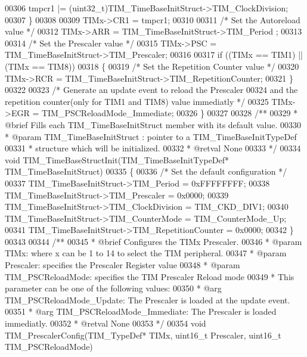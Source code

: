 \begin{DoxyCode}
00306     tmpcr1 |= (uint32\_t)TIM\_TimeBaseInitStruct->TIM_ClockDivision;
00307   \}
00308 
00309   TIMx->CR1 = tmpcr1;
00310 
00311   \textcolor{comment}{/* Set the Autoreload value */}
00312   TIMx->ARR = TIM\_TimeBaseInitStruct->TIM\_Period ;
00313 
00314   \textcolor{comment}{/* Set the Prescaler value */}
00315   TIMx->PSC = TIM\_TimeBaseInitStruct->TIM\_Prescaler;
00316 
00317   \textcolor{keywordflow}{if} ((TIMx == TIM1) || (TIMx == TIM8))
00318   \{
00319     \textcolor{comment}{/* Set the Repetition Counter value */}
00320     TIMx->RCR = TIM\_TimeBaseInitStruct->TIM\_RepetitionCounter;
00321   \}
00322 
00323   \textcolor{comment}{/* Generate an update event to reload the Prescaler }
00324 \textcolor{comment}{     and the repetition counter(only for TIM1 and TIM8) value immediatly */}
00325   TIMx->EGR = TIM_PSCReloadMode_Immediate;
00326 \}
00327 
00328 \textcolor{comment}{/**}
00329 \textcolor{comment}{  * @brief  Fills each TIM\_TimeBaseInitStruct member with its default value.}
00330 \textcolor{comment}{  * @param  TIM\_TimeBaseInitStruct : pointer to a TIM\_TimeBaseInitTypeDef}
00331 \textcolor{comment}{  *         structure which will be initialized.}
00332 \textcolor{comment}{  * @retval None}
00333 \textcolor{comment}{  */}
00334 \textcolor{keywordtype}{void} TIM_TimeBaseStructInit(TIM\_TimeBaseInitTypeDef* TIM\_TimeBaseInitStruct)
00335 \{
00336   \textcolor{comment}{/* Set the default configuration */}
00337   TIM\_TimeBaseInitStruct->TIM_Period = 0xFFFFFFFF;
00338   TIM\_TimeBaseInitStruct->TIM_Prescaler = 0x0000;
00339   TIM\_TimeBaseInitStruct->TIM_ClockDivision = TIM_CKD_DIV1;
00340   TIM\_TimeBaseInitStruct->TIM_CounterMode = TIM_CounterMode_Up;
00341   TIM\_TimeBaseInitStruct->TIM_RepetitionCounter = 0x0000;
00342 \}
00343 
00344 \textcolor{comment}{/**}
00345 \textcolor{comment}{  * @brief  Configures the TIMx Prescaler.}
00346 \textcolor{comment}{  * @param  TIMx: where x can be  1 to 14 to select the TIM peripheral.}
00347 \textcolor{comment}{  * @param  Prescaler: specifies the Prescaler Register value}
00348 \textcolor{comment}{  * @param  TIM\_PSCReloadMode: specifies the TIM Prescaler Reload mode}
00349 \textcolor{comment}{  *          This parameter can be one of the following values:}
00350 \textcolor{comment}{  *            @arg TIM\_PSCReloadMode\_Update: The Prescaler is loaded at the update event.}
00351 \textcolor{comment}{  *            @arg TIM\_PSCReloadMode\_Immediate: The Prescaler is loaded immediatly.}
00352 \textcolor{comment}{  * @retval None}
00353 \textcolor{comment}{  */}
00354 \textcolor{keywordtype}{void} TIM_PrescalerConfig(TIM\_TypeDef* TIMx, uint16\_t Prescaler, uint16\_t TIM\_PSCReloadMode)

\end{DoxyCode}
